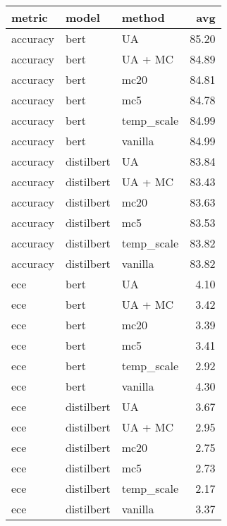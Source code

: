 \begin{tabular}{lllr}
\toprule
   metric &       model &      method &    avg \\
\midrule
 accuracy &        bert &          UA &  85.20 \\
 accuracy &        bert &     UA + MC &  84.89 \\
 accuracy &        bert &        mc20 &  84.81 \\
 accuracy &        bert &         mc5 &  84.78 \\
 accuracy &        bert &  temp\_scale &  84.99 \\
 accuracy &        bert &     vanilla &  84.99 \\
 accuracy &  distilbert &          UA &  83.84 \\
 accuracy &  distilbert &     UA + MC &  83.43 \\
 accuracy &  distilbert &        mc20 &  83.63 \\
 accuracy &  distilbert &         mc5 &  83.53 \\
 accuracy &  distilbert &  temp\_scale &  83.82 \\
 accuracy &  distilbert &     vanilla &  83.82 \\
      ece &        bert &          UA &   4.10 \\
      ece &        bert &     UA + MC &   3.42 \\
      ece &        bert &        mc20 &   3.39 \\
      ece &        bert &         mc5 &   3.41 \\
      ece &        bert &  temp\_scale &   2.92 \\
      ece &        bert &     vanilla &   4.30 \\
      ece &  distilbert &          UA &   3.67 \\
      ece &  distilbert &     UA + MC &   2.95 \\
      ece &  distilbert &        mc20 &   2.75 \\
      ece &  distilbert &         mc5 &   2.73 \\
      ece &  distilbert &  temp\_scale &   2.17 \\
      ece &  distilbert &     vanilla &   3.37 \\
\bottomrule
\end{tabular}
